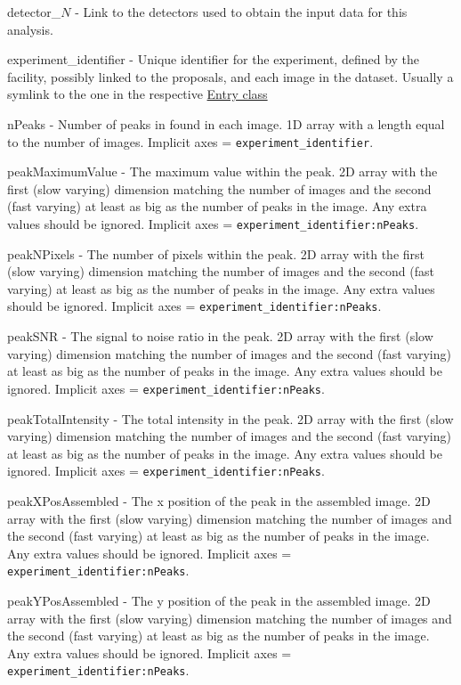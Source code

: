 \documentclass[usletter,11pt]{article}
\newcommand{\member}[2]
{ \noindent
{ \color{softBlue}  #1 - } #2
\vspace{0.2cm}
}
\begin{document}
\member{detector\_$N$}{Link to the detectors used to obtain the input data for this
analysis.}

\member{experiment\_identifier}{Unique identifier for the experiment,
defined by the facility, possibly linked to the proposals, and each image in the
dataset. Usually a symlink to the one in the respective \hyperref[table:entry]{Entry class}}

\member{nPeaks}{Number of peaks in found in each image. 1D array with a length
  equal to the number of images. Implicit axes = {\tt experiment\_identifier}.}

\member{peakMaximumValue}{The maximum value within the peak. 2D array with the
  first (slow varying) dimension matching the number of images and the second
  (fast varying) at least as big as the number of peaks in
  the image. Any extra values should be ignored. Implicit axes = {\tt experiment\_identifier:nPeaks}.}

\member{peakNPixels}{The number of pixels within the peak. 2D array with the
  first (slow varying) dimension matching the number of images and the second
  (fast varying) at least as big as the number of peaks in
  the image. Any extra values should be ignored. Implicit axes = {\tt experiment\_identifier:nPeaks}.}

\member{peakSNR}{The signal to noise ratio in the peak. 2D array with the
  first (slow varying) dimension matching the number of images and the second
  (fast varying) at least as big as the number of peaks in
  the image. Any extra values should be ignored. Implicit axes = {\tt experiment\_identifier:nPeaks}.}

\member{peakTotalIntensity}{The total intensity in the peak. 2D array with the
  first (slow varying) dimension matching the number of images and the second
  (fast varying) at least as big as the number of peaks in
  the image. Any extra values should be ignored. Implicit axes = {\tt experiment\_identifier:nPeaks}.}

\member{peakXPosAssembled}{The x position of the peak in the assembled image. 2D array with the
  first (slow varying) dimension matching the number of images and the second
  (fast varying) at least as big as the number of peaks in
  the image. Any extra values should be ignored. Implicit axes = {\tt experiment\_identifier:nPeaks}.}

\member{peakYPosAssembled}{The y position of the peak in the assembled image. 2D array with the
  first (slow varying) dimension matching the number of images and the second
  (fast varying) at least as big as the number of peaks in
  the image. Any extra values should be ignored. Implicit axes = {\tt experiment\_identifier:nPeaks}.}
\end{document}
